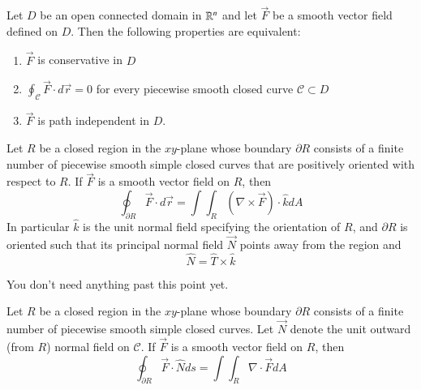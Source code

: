 \documentclass[12pt, a4paper, oneside, openright, titlepage]{book}
\begin{document}
\begin{appendices}
    
    \begin{thm}
        Let $D$ be an open connected domain in $\mathbb R^n$ and let $\vec{F}$ be a smooth vector field defined on $D$. Then the following properties are equivalent:\begin{enumerate}
            \item $\vec{F}$ is conservative in $D$ 
            \item $\oint_{\mathcal{C}} \vec{F}\cdot d\vec{r} = 0$ for every piecewise smooth closed curve $\mathcal{C} \subset D$ 
            \item $\vec{F}$ is path independent in $D$.
        \end{enumerate}
    \end{thm}
    
    \begin{namthm}
        Let $R$ be a closed region in the $xy$-plane whose boundary $\partial R$ consists of a finite number of piecewise smooth simple closed curves that are positively oriented with respect to $R$. If $\vec{F}$ is a smooth vector field on $R$, then \begin{equation}
            \oint_{\partial R}\vec{F}\cdot d\vec{r} = \int\int_{R}(\nabla \times \vec{F})\cdot \hat{k}dA
        \end{equation}
        In particular $\hat{k}$ is the unit normal field specifying the orientation of $R$, and $\partial R$ is oriented such that its principal normal field $\vec{N}$ points away from the region and \begin{equation}
            \hat{N} = \hat{T} \times \hat{k}
        \end{equation}
    \end{namthm}
    
    \begin{rmk}
        You don't need anything past this point yet.
    \end{rmk}
    
    \begin{namthm}
        Let $R$ be a closed region in the $xy$-plane whose boundary $\partial R$ consists of a finite number of piecewise smooth simple closed curves. Let $\vec{N}$ denote the unit outward (from $R$) normal field on $\mathcal{C}$. If $\vec{F}$ is a smooth vector field on $R$, then \begin{equation}
            \oint_{\partial R}\vec{F}\cdot \hat{N} ds = \int\int_{R}\nabla \cdot \vec{F}dA
        \end{equation}
    \end{namthm}
    

\end{appendices}
\end{document}
